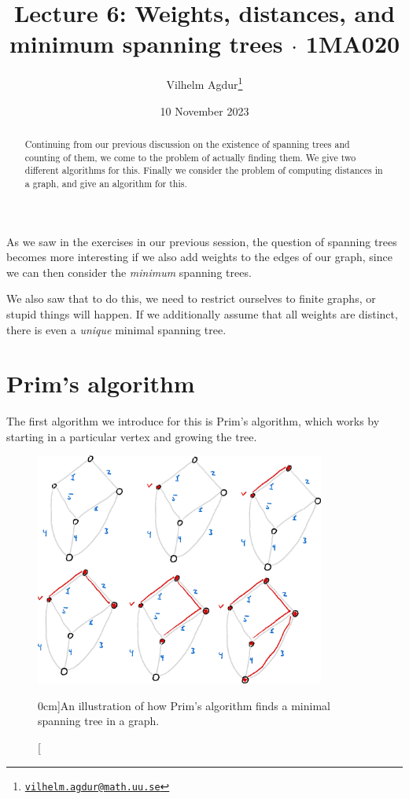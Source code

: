 \documentclass[nobib]{tufte-handout}
\title{Lecture 6: Weights, distances, and minimum spanning trees $\cdot$ 1MA020}
\author[Vilhelm Agdur]{Vilhelm Agdur\thanks{\href{mailto:vilhelm.agdur@math.uu.se}{\nolinkurl{vilhelm.agdur@math.uu.se}}}}
\date{10 November 2023}
\begin{document}
\maketitle%

\begin{abstract}
\noindent
Continuing from our previous discussion on the existence of spanning trees and counting of them, we come to the problem of actually finding them. We give two different algorithms for this. Finally we consider the problem of computing distances in a graph, and give an algorithm for this.
\end{abstract}

As we saw in the exercises in our previous session, the question of spanning trees becomes more interesting if we also add weights to the edges of our graph, since we can then consider the \emph{minimum} spanning trees.

We also saw that to do this, we need to restrict ourselves to finite graphs, or stupid things will happen. If we additionally assume that all weights are distinct, there is even a \emph{unique} minimal spanning tree.

\section{Prim's algorithm}

The first algorithm we introduce for this is Prim's algorithm, which works by starting in a particular vertex and growing the tree.

\begin{figure}
  \centering
  \includegraphics[width=0.85\textwidth]{graphics/L6_prim_kruskal_dijkstra/prims_algorithm.png}
  \caption[][0cm]{An illustration of how Prim's algorithm finds a minimal spanning tree in a graph.}
  \label{fig:prims_algorithm}
\end{figure}
\end{document}

